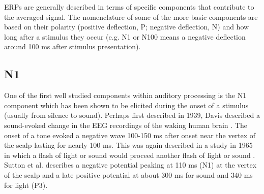 \documentclass[a4paper,11pt,final]{ThesisStyle}
\begin{document}
ERPs are generally described in terms of specific components that contribute to the averaged signal.  The nomenclature of some of the more basic components are based on their polarity (positive deflection, P; negative deflection, N) and how long after a stimulus they occur (e.g. N1 or N100 means a negative deflection around 100 ms after stimulus presentation).  

\subsection{N1}

One of the first well studied components within auditory processing is the N1 component which has been shown to be elicited during the onset of a stimulus (usually from silence to sound).  Perhaps first described in 1939, Davis described a sound-evoked change in the EEG recordings of the waking human brain \cite{Davis1939}.  The onset of a tone evoked a negative wave 100-150 ms after onset near the vertex of the scalp lasting for nearly 100 ms.  This was again described in a study in 1965 in which a flash of light or sound would proceed another flash of light or sound \cite{Sutton1965}.  Sutton et al. describes a negative potential peaking at 110 ms (N1) at the vertex of the scalp and a late positive potential at about 300 ms for sound and 340 ms for light (P3).  
\end{document}
